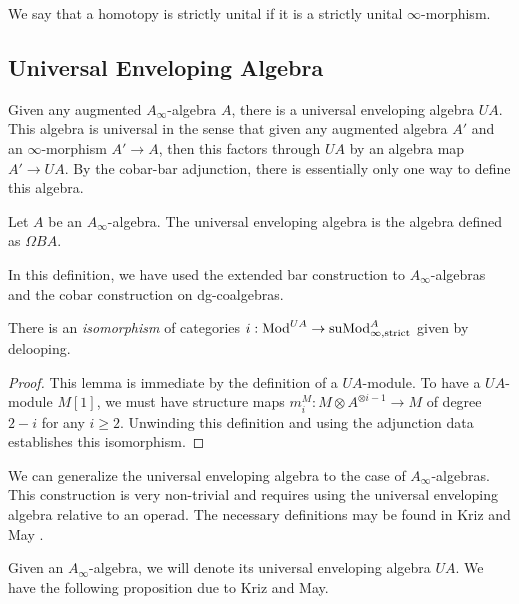 \documentclass[../thesis.tex]{subfiles}
\begin{document}
            We say that a homotopy is strictly unital if it is a strictly unital $\infty$-morphism.

        \subsection{Universal Enveloping Algebra}

            Given any augmented $A_\infty$-algebra $A$, there is a universal enveloping algebra $UA$. This algebra is universal in the sense that given any augmented algebra $A'$ and an $\infty$-morphism  $A' \rightarrow A$, then this factors through $UA$ by an algebra map $A' \rightarrow UA$. By the cobar-bar adjunction, there is essentially only one way to define this algebra.

            \begin{definition}
                Let $A$ be an $A_\infty$-algebra. The universal enveloping algebra is the algebra defined as $\Omega BA$.
            \end{definition}
            \begin{remark}
                In this definition, we have used the extended bar construction to $A_\infty$-algebras and the cobar construction on dg-coalgebras.
            \end{remark}

            \begin{lemma}\label{lem: Polydules-are-modules}
                There is an \textit{isomorphism} of categories $i : \tt{Mod}^{UA} \rightarrow \tt{suMod}_{\infty, \tt{strict}}^{A}$ given by delooping.
            \end{lemma}
            \begin{proof}
                This lemma is immediate by the definition of a $UA$-module. To have a $UA$-module $M[1]$, we must have structure maps $m_i^M : M \otimes A^{\otimes i-1} \rightarrow M$ of degree $2-i$ for any $i \geq 2$. Unwinding this definition and using the adjunction data establishes this isomorphism.
            \end{proof}

            We can generalize the universal enveloping algebra to the case of $A_\infty$-algebras. This construction is very non-trivial and requires using the universal enveloping algebra relative to an operad. The necessary definitions may be found in Kriz and May \cite{Kriz95}.
            
            Given an $A_\infty$-algebra, we will denote its universal enveloping algebra $UA$. We have the following proposition due to Kriz and May.
\end{document}
